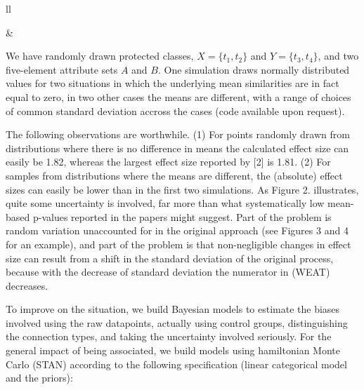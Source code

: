 \documentclass[12pt,dvipsnames,enabledeprecatedfontcommands]{scrartcl}
\begin{document}
\begin{tabular}{ll}
\begin{minipage}[c]{0.35\linewidth}
\end{minipage}& \begin{minipage}[c]{0.6\linewidth}

We have randomly drawn protected classes, $X=\{t_1,t_2\}$ and $Y=\{t_3,t_4\}$, and two five-element attribute sets $A$ and $B$. One simulation draws normally distributed values  for two situations in which the underlying mean similarities are in fact equal to zero, in two other cases  the means are different, with a range of choices of common standard deviation  accross the cases (code available upon request).

\end{minipage}
\end{tabular}

\vspace{1mm}

The following observations are worthwhile. (1) For points randomly drawn
from distributions where there is no difference in means the calculated
effect size can easily be 1.82, whereas the largest effect size reported
by {[}2{]} is 1.81. (2) For samples from distributions where the means
are different, the (absolute) effect sizes can easily be lower than in
the first two simulations. As Figure 2. illustrates, quite some
uncertainty is involved, far more than what systematically low
mean-based p-values reported in the papers might suggest. Part of the
problem is random variation unaccounted for in the original approach
(see Figures 3 and 4 for an example), and part of the problem is that
non-negligible changes in effect size can result from a shift in the
standard deviation of the original process, because with the decrease of
standard deviation the numerator in (WEAT) decreases.

To improve on the situation, we build Bayesian models to estimate the
biases involved using the raw datapoints, actually using control groups,
distinguishing the connection types, and taking the uncertainty involved
seriously. For the general impact of being associated, we build models
using hamiltonian Monte Carlo (STAN) according to the following
specification (linear categorical model and the priors):
\end{document}
